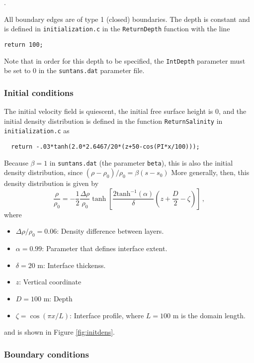 \medskip
\noindent
\mfiledownload.

\medskip
\noindent
All boundary edges are of type 1 (closed) boundaries.
The depth is constant and is defined in \verb+initialization.c+ in the 
\verb+ReturnDepth+ function with the line
\begin{verbatim}
return 100;
\end{verbatim}
Note that in order for this depth to be specified, the \verb+IntDepth+ parameter must
be set to 0 in the \verb+suntans.dat+ parameter file.

\subsubsection{Initial conditions}

The initial velocity field is quiescent, the initial free surface height is 0,
and the initial density distribution is defined in the function \verb+ReturnSalinity+
in \verb+initialization.c+ as
\begin{verbatim}
  return -.03*tanh(2.0*2.6467/20*(z+50-cos(PI*x/100)));
\end{verbatim}
Because $\beta=1$ in \verb+suntans.dat+ (the parameter \verb+beta+), this is also the initial density 
distribution, since $(\rho-\rho_0)/\rho_0 = \beta(s-s_0)$ More generally, then, 
this density distribution is given by
\[
\frac{\rho}{\rho_0} = -\frac{1}{2}\frac{\Delta\rho}{\rho_0}
\tanh\left[\frac{2\mbox{tanh}^{-1}(\alpha)}{\delta}\left(z+\frac{D}{2}-\zeta\right)\right]\,,
\]
where
\begin{itemize}
\item $\Delta\rho/\rho_0=0.06$: Density difference between layers.
\item $\alpha=0.99$: Parameter that defines interface extent.
\item $\delta=20$ m: Interface thickenss.
\item $z$: Vertical coordinate
\item $D=100$ m: Depth
\item $\zeta = \cos(\pi x/L)$: Interface profile, where $L=100$ m is the domain length.
\end{itemize}
and is shown in Figure \ref{fig:initdens}. 

\subsubsection{Boundary conditions}

